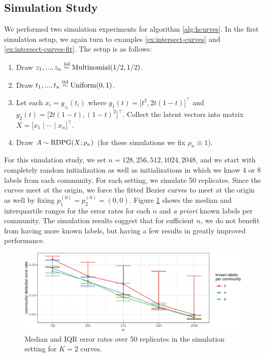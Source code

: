 \documentclass[
  12pt,
]{article}
\providecommand{\tightlist}{%
  \setlength{\itemsep}{0pt}\setlength{\parskip}{0pt}}
\theoremstyle{definition}
\theoremstyle{definition}
\theoremstyle{definition}
\theoremstyle{definition}
\theoremstyle{remark}
\begin{document}
\hypertarget{simulation-study-1}{%
\subsection{Simulation Study}\label{simulation-study-1}}

We performed two simulation experiments for algorithm \ref{alg:kcurves}.
In the first simulation setup, we again turn to examples \ref{ex:intersect-curves} and \ref{ex:intersect-curves-fit}.
The setup is as follows:

\begin{enumerate}
\def\labelenumi{\arabic{enumi}.}
\tightlist
\item
  Draw \(z_1, ..., z_n \stackrel{\mathrm{iid}}{\sim} \mathrm{Multinomial}(1/2, 1/2)\).
\item
  Draw \(t_1, ..., t_n \stackrel{\mathrm{iid}}{\sim} \mathrm{Uniform}(0, 1)\).
\item
  Let each \(x_i = g_{z_i}(t_i)\) where \(g_1(t) = \Big[ t^2, 2 t (1-t) \Big]^\top\) and \(g_2(t) = \Big[ 2 t (1-t), (1-t)^2 \Big]^\top\).
  Collect the latent vectors into matrix \(X = \Big[ x_1 \mid \cdots \mid x_n \Big]^\top\).
\item
  Draw \(A \sim \mathrm{RDPG}(X; \rho_n)\) (for these simulations we fix \(\rho_n \equiv 1\)).
\end{enumerate}

For this simulation study, we set \(n = 128, 256, 512, 1024, 2048\), and we start with completely random initialization as well as initializations in which we know 4 or 8 labels from each community.
For each setting, we simulate 50 replicates.
Since the curves meet at the origin, we force the fitted Bezier curves to meet at the origin as well by fixing \(p_1^{(0)} = p_2^{(0)} = (0, 0)\).
Figure \ref{fig:sim-curves} shows the median and interquartile ranges for the error rates for each \(n\) and \emph{a priori} known labels per community.
The simulation results suggest that for sufficient \(n\), we do not benefit from having more known labels, but having a few results in greatly improved performance.

\begin{figure}[H]

{\centering \includegraphics{draft_files/figure-latex/sim-curves-1} 

}

\caption{Median and IQR error rates over 50 replicates in the simulation setting for $K = 2$ curves.}\label{fig:sim-curves}
\end{figure}
\end{document}
